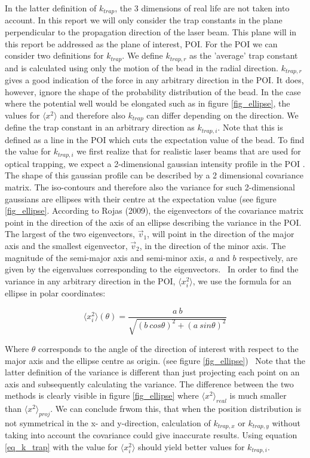 In the latter definition of $k_{trap}$, the 3 dimensions of real life are not taken into account. In this report we will only consider the trap constants in the plane perpendicular to the propagation direction of the laser beam. This plane will in this report be addressed as the plane of interest, POI. For the POI we can consider two definitions for $k_{trap}$. We define $k_{trap,r}$ as the 'average' trap constant and is calculated using only the motion of the bead in the radial direction. $k_{trap,r}$ gives a good indication of the force in any arbitrary direction in the POI. It does, however, ignore the shape of the probability distribution of the bead. In the case where the potential well would be elongated such as in figure \ref{fig_ellipse}, the values for $ \langle x^2 \rangle $ and therefore also $k_{trap}$ can differ depending on the direction. We define the trap constant in an arbitrary direction as $k_{trap,i}$. Note that this is defined as a line in the POI which cuts the expectation value of the bead. To find the value for $k_{trap,i}$ we first realize that for realistic laser beams that are used for optical trapping, we expect a 2-dimensional gaussian intensity profile in the POI \cite{sheavitz}. The shape of this gaussian profile can be described by a 2 dimensional covariance matrix. The iso-contours and therefore also the variance for such 2-dimensional gaussians are ellipses with their centre at the expectation value \cite{chuong} (see figure \ref{fig_ellipse}. According to Rojas (2009), the eigenvectors of the covariance matrix point in the direction of the axis of an ellipse describing the variance in the POI. The largest of the two eigenvectors, $\vec{v}_1$, will point in the direction of the major axis and the smallest eigenvector, $\vec{v}_2$, in the direction of the minor axis. The magnitude of the semi-major axis and semi-minor axis, $a$ and $b$ respectively, are given by the eigenvalues corresponding to the eigenvectors.\cite{rojas} \
In order to find the variance in any arbitrary direction in the POI,  $ \langle x_i^2 \rangle$, we use the formula for an ellipse in polar coordinates:
\label{alternate_method}

\begin{equation}
	 \langle x_i^2 \rangle ( \theta ) = \frac{a \: b}{\sqrt{( b \: cos\theta)^2 + (a \: sin\theta )^2}}
\end{equation}

Where $\theta$ corresponds to the angle of the direction of interest with respect to the major axis and the ellipse centre as origin. (see figure \ref{fig_ellipse}) \
Note that the latter definition of the variance is different than just projecting each point on an axis and subsequently calculating the variance. The difference between the two methods is clearly visible in figure \ref{fig_ellipse} where $\langle x^2 \rangle _{real}$ is much smaller than $\langle x^2 \rangle _{proj}$. We can conclude frwom this, that when the position distribution is not symmetrical in the x- and y-direction, calculation of $k_{trap,x}$ or $k_{trap,y}$ without taking into account the covariance could give inaccurate results. Using equation \ref{eq_k_trap} with the value for $  \langle x_i^2 \rangle $ should yield better values for $k_{trap,i}$. 


